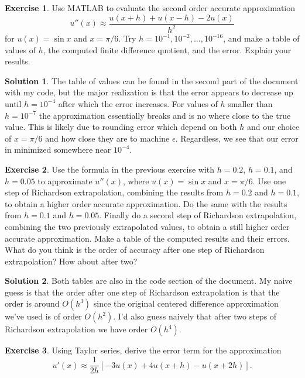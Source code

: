 \documentclass[12pt]{article}
\theoremstyle{definition}
\newtheorem{exer}{Exercise}
\newtheorem{sol}{Solution}
\theoremstyle{remark}
\begin{document}
\begin{exer}
Use MATLAB to evaluate the second order accurate approximation 
\[
u'' (x) \approx \frac{u(x+h) + u(x-h) - 2 u(x)}{h^2}
\]
for $u(x) = \sin x$ and $x = \pi / 6$.  Try $h = 10^{-1} , 10^{-2} , \ldots ,
10^{-16}$, and make a table of values of $h$, the computed finite difference
quotient, and the error.  Explain your results.
\end{exer}

\begin{sol}\leavevmode
    The table of values can be found in the second part of the document with my code, but the major realization is that the error appears to decrease up until $h = 10^{-4}$ after which the error increases. For values of $h$ smaller than $h = 10^{-7}$ the approximation essentially breaks and is no where close to the true value. This is likely due to rounding error which depend on both $h$ and our choice of $x = \pi / 6$ and how close they are to machine $\epsilon$. Regardless, we see that our error in minimized somewhere near $10^{-4}$.
\end{sol}

\newpage

\begin{exer}
  Use the formula in the previous exercise with $h=0.2$, $h=0.1$, and $h=0.05$ 
to approximate $u'' (x)$, where $u(x) = \sin x$ and $x = \pi / 6$.  Use one 
step of Richardson extrapolation, combining the results from $h=0.2$ and $h=0.1$, 
to obtain a higher order accurate approximation.  Do the same with the results 
from $h=0.1$ and $h=0.05$.  Finally do a second step of Richardson extrapolation, 
combining the two previously extrapolated values, to obtain a still higher 
order accurate approximation.  Make a table of the computed results and their 
errors.  What do you think is the order of accuracy after one step of Richardson 
extrapolation?  How about after two?
\end{exer}

\begin{sol}
    Both tables are also in the code section of the document. My naive guess is that the order after one step of Richardson extrapolation is that the order is around $O(h^3)$ since the original centered difference approximation we've used is of order $O(h^2)$. I'd also guess naively that after two steps of Richardson extrapolation we have order $O(h^4)$. 
\end{sol}

\newpage

\begin{exer}
    Using Taylor series, derive the error term for the approximation
\[
u' (x) \approx \frac{1}{2h} [ -3 u(x) + 4 u(x+h) - u(x+2h) ] .
\]
\end{exer}
\end{document}
